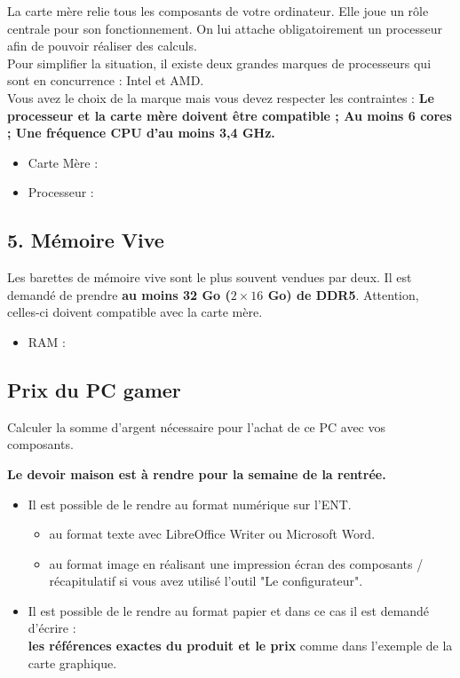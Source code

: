 La carte mère relie tous les composants de votre ordinateur. Elle joue un rôle centrale pour son fonctionnement. On lui attache obligatoirement un processeur afin de pouvoir réaliser des calculs.\\

Pour simplifier la situation, il existe deux grandes marques de processeurs qui sont en concurrence : Intel et AMD. \\

Vous avez le choix de la marque mais vous devez respecter les contraintes : \textbf{Le processeur et la carte mère doivent être compatible ; Au moins 6 cores ; Une fréquence CPU d'au moins 3,4 GHz.}

\begin{itemize}[label={$\bullet$}]
  \item Carte Mère :  \dotfill
  \item Processeur :  \dotfill
\end{itemize} 


\subsection*{5. Mémoire Vive} 

Les barettes de mémoire vive sont le plus souvent vendues par deux. Il est demandé de prendre \textbf{au moins 32 Go ($2 \times 16$ Go) de DDR5}. Attention, celles-ci doivent compatible avec la carte mère. 

\begin{itemize}[label={$\bullet$}]
  \item RAM :  \dotfill
\end{itemize} 


\subsection*{Prix du PC gamer} 

Calculer la somme d'argent nécessaire pour l'achat de ce PC avec vos composants.

\Pointilles[2]

\horrule{2px}

\begin{center}
  \textbf{Le devoir maison est à rendre pour la semaine de la rentrée.}
\end{center}

\begin{itemize}
  \item Il est possible de le rendre au format numérique sur l'ENT. 
  \begin{itemize}[label={$\bullet$}]
    \item au format texte avec LibreOffice Writer ou Microsoft Word.  
    \item au format image en réalisant une impression écran des composants / récapitulatif si vous avez utilisé l'outil "Le configurateur".
  \end{itemize}
  \item Il est possible de le rendre au format papier et dans ce cas il est demandé d'écrire : \\
  \textbf{les références exactes du produit et le prix} comme dans l'exemple de la carte graphique. 
\end{itemize} 

